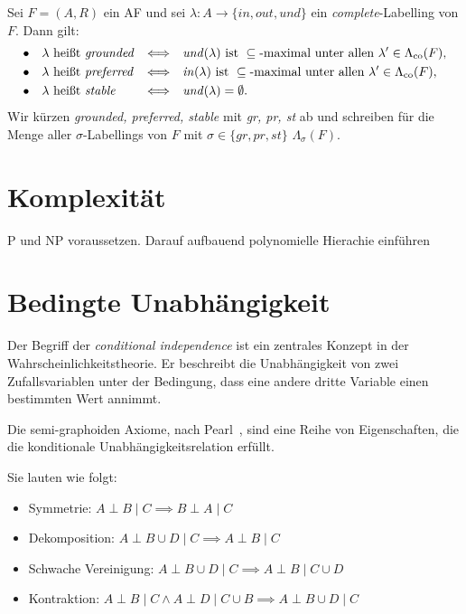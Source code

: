 \begin{Definition}
    \label{def:sem-labelling}
    Sei \(F=(A,R)\) ein AF und sei \(\lambda : A \to \{\mathit{in},\mathit{out},\mathit{und}\}\)
    ein \textit{complete}-Labelling von \(F\). Dann gilt:
    \[
    \begin{alignedat}{2}
        \bullet\quad
        &\lambda \text{ heißt } \text{\textit{grounded}}
        &\quad\Longleftrightarrow\quad&
        \mathit{und}(\lambda)\text{ ist } \subseteq\text{-maximal unter allen }
        \lambda'\in\Lambda_{\mathrm{co}}(F),\\
        \bullet\quad
        &\lambda \text{ heißt } \text{\textit{preferred}}
        &\quad\Longleftrightarrow\quad&
        \mathit{in}(\lambda)\text{ ist } \subseteq\text{-maximal unter allen }
        \lambda'\in\Lambda_{\mathrm{co}}(F),\\
        \bullet\quad
        &\lambda \text{ heißt } \text{\textit{stable}}
        &\quad\Longleftrightarrow\quad&
        \mathit{und}(\lambda)=\emptyset.
    \end{alignedat}
    \]
      Wir kürzen \emph{grounded, preferred, stable} mit \emph{gr, pr, st} ab und schreiben für die Menge
      aller \(\sigma\)-Labellings von $F$ mit \(\sigma \in \{gr, pr, st\}\) \(\Lambda_{\sigma}(F)\).
\end{Definition}

\newpage

\section{Komplexität}
\label{sec:komp}
P und NP voraussetzen.
Darauf aufbauend polynomielle Hierachie einführen

\newpage


\section{Bedingte Unabhängigkeit}
\label{sec:bu}
      Der Begriff der \emph{conditional independence} ist ein zentrales Konzept in der Wahrscheinlichkeitstheorie.
      Er beschreibt die Unabhängigkeit von zwei Zufallsvariablen unter der Bedingung, 
      dass eine andere dritte Variable einen bestimmten Wert annimmt.

      Die semi-graphoiden Axiome, nach Pearl~\cite{pearl:2010}, sind eine Reihe von Eigenschaften, 
      die die konditionale Unabhängigkeitsrelation erfüllt.\par Sie lauten wie folgt:
      \begin{itemize}
            \item Symmetrie: $A \perp B \mid C \implies B \perp A \mid C$
            \item Dekomposition: $A \perp B \cup D \mid C \implies A \perp B \mid C$ 
            \item Schwache Vereinigung: $A \perp B \cup D \mid C \implies A \perp B \mid C \cup D$ 
            \item Kontraktion: $A \perp B \mid C \land A \perp D \mid C \cup B \implies A \perp B \cup D \mid C$
      \end{itemize}   
\newpage

